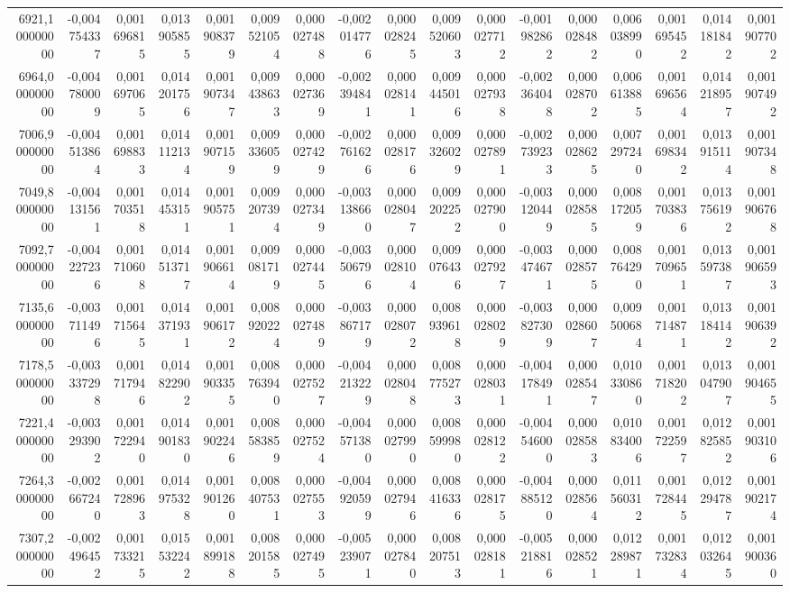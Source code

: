 \begin{longtable}{rrrrrrrrrrrrrrrrr}
6921,100000000 & -0,004754337 & 0,001696815 & 0,013905855 & 0,001908379 & 0,009521054 & 0,000027488 & -0,002014776 & 0,000028245 & 0,009520603 & 0,000027712 & -0,001982862 & 0,000028482 & 0,006038990 & 0,001695452 & 0,014181842 & 0,001907702\\
6964,000000000 & -0,004780009 & 0,001697065 & 0,014201756 & 0,001907347 & 0,009438633 & 0,000027369 & -0,002394841 & 0,000028141 & 0,009445016 & 0,000027938 & -0,002364048 & 0,000028702 & 0,006613885 & 0,001696564 & 0,014218957 & 0,001907492\\
7006,900000000 & -0,004513864 & 0,001698833 & 0,014112134 & 0,001907159 & 0,009336059 & 0,000027429 & -0,002761626 & 0,000028176 & 0,009326029 & 0,000027891 & -0,002739233 & 0,000028625 & 0,007297240 & 0,001698342 & 0,013915114 & 0,001907348\\
7049,800000000 & -0,004131561 & 0,001703518 & 0,014453151 & 0,001905751 & 0,009207394 & 0,000027349 & -0,003138660 & 0,000028047 & 0,009202252 & 0,000027900 & -0,003120449 & 0,000028585 & 0,008172059 & 0,001703836 & 0,013756192 & 0,001906768\\
7092,700000000 & -0,004227236 & 0,001710608 & 0,014513717 & 0,001906614 & 0,009081719 & 0,000027445 & -0,003506796 & 0,000028104 & 0,009076436 & 0,000027927 & -0,003474671 & 0,000028575 & 0,008764290 & 0,001709651 & 0,013597387 & 0,001906593\\
7135,600000000 & -0,003711496 & 0,001715645 & 0,014371931 & 0,001906172 & 0,008920224 & 0,000027489 & -0,003867179 & 0,000028072 & 0,008939618 & 0,000028029 & -0,003827309 & 0,000028607 & 0,009500684 & 0,001714871 & 0,013184142 & 0,001906392\\
7178,500000000 & -0,003337298 & 0,001717946 & 0,014822902 & 0,001903355 & 0,008763940 & 0,000027527 & -0,004213229 & 0,000028048 & 0,008775273 & 0,000028031 & -0,004178491 & 0,000028547 & 0,010330860 & 0,001718202 & 0,013047907 & 0,001904655\\
7221,400000000 & -0,003293902 & 0,001722940 & 0,014901830 & 0,001902246 & 0,008583859 & 0,000027524 & -0,004571380 & 0,000027990 & 0,008599980 & 0,000028122 & -0,004546000 & 0,000028583 & 0,010834006 & 0,001722597 & 0,012825852 & 0,001903106\\
7264,300000000 & -0,002667240 & 0,001728963 & 0,014975328 & 0,001901260 & 0,008407531 & 0,000027553 & -0,004920599 & 0,000027946 & 0,008416336 & 0,000028175 & -0,004885120 & 0,000028564 & 0,011560312 & 0,001728445 & 0,012294787 & 0,001902174\\
7307,200000000 & -0,002496452 & 0,001733215 & 0,015532242 & 0,001899188 & 0,008201585 & 0,000027495 & -0,005239071 & 0,000027840 & 0,008207513 & 0,000028181 & -0,005218816 & 0,000028521 & 0,012289871 & 0,001732834 & 0,012032645 & 0,001900360\\

\end{longtable}
